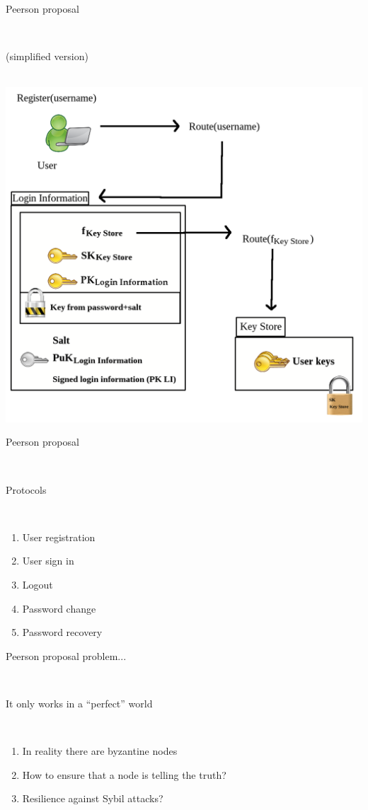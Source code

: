 \documentclass[12pt]{beamer}
\renewcommand{\frametitle}[1]{\vspace{0.2cm}\begin{huge}#1\end{huge}\\}
\renewcommand{\framesubtitle}[1]{\vspace{0.4cm} \hspace{0.4cm}\begin{large}#1\end{large}\\}
\begin{document}
  \begin{frame}
  \frametitle{Peerson proposal}
  \framesubtitle{(simplified version)} 
  \center
  \includegraphics[height=0.7\textheight]{../../../img/password_peerson_alternative}\\
  \end{frame}

  \begin{frame}
  \frametitle{Peerson proposal}
  \framesubtitle{Protocols}

  \begin{enumerate}
    \item User registration
    \item User sign in
    \item Logout
    \item Password change
    \item Password recovery
  \end{enumerate}
  \end{frame}

  \begin{frame}
  \frametitle{Peerson proposal problem...}
  \framesubtitle{It only works in a ``perfect'' world}

  \begin{enumerate}
    \item In reality there are byzantine nodes
    \item How to ensure that a node is telling the truth?
    \item Resilience against Sybil attacks?
  \end{enumerate}
  \end{frame}
  
\end{document}

